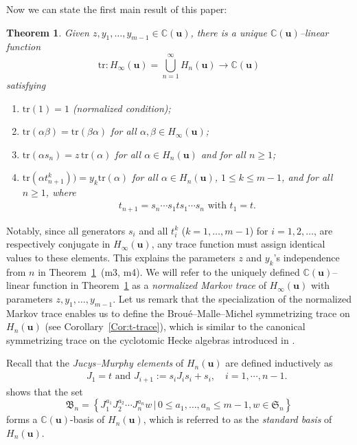 \documentclass[a4paper, oneside]{amsart}
\numberwithin{equation}{section}
\newtheorem{theorem}[equation]{Theorem}
\theoremstyle{definition}
\theoremstyle{remark}
\begin{document}
 Now we can state the first main result of this paper:
\begin{theorem}\label{Them:Markov}
  Given $z, y_1, \ldots, y_{m-1}\in \mathbb{C}(\boldsymbol{u})$, there is  a  unique $\mathbb{C}(\boldsymbol{u})$--linear function
   \begin{equation*}
     \mathrm{tr}: H_{\infty}(\boldsymbol{u})=\bigcup_{n=1}^{\infty}H_n(\boldsymbol{u})\rightarrow\mathbb{C}(\boldsymbol{u})
\end{equation*}
satisfying
\begin{enumerate}
\item[(m1)] $ \mathrm{tr}(1)=1$ (normalized condition);
\item[(m2)] $\mathrm{tr}(\alpha\beta)=\mathrm{tr}(\beta\alpha)$ for all $\alpha,\beta\in H_{\infty}(\boldsymbol{u})$;
\item[(m3)] $\mathrm{tr}(\alpha s_n)=z\,\mathrm{tr}(\alpha)$  for all $\alpha\in H_{n}(\boldsymbol{u})$ and for all $n\geq 1$;
\item[(m4)] $\mathrm{tr}(\alpha t_{n+1}^k))=y_{k}\mathrm{tr}(\alpha)$ for all $\alpha\in H_n(\boldsymbol{u})$,  $1\leq k\leq m-1$, and for all $n\geq 1$, where \begin{align*}t_{n+1}=s_{n}\cdots s_1ts_1\cdots s_{n} \text{ with }t_1=t.\end{align*}
\end{enumerate}
\end{theorem}
Notably, since all generators $s_i$ and all $t_i^k$ ($k=1, \ldots,m-1$) for $i=1,2,\ldots$, are respectively conjugate in $H_{\infty}(\boldsymbol{u})$, any trace function must assign identical values to these elements. This explains the parameters $z$ and $y_k$'s independence from $n$ in Theorem~\ref{Them:Markov}~(m3, m4). We will refer to the uniquely defined $\mathbb{C}(\boldsymbol{u})$--linear function in Theorem~\ref{Them:Markov} as a \emph{normalized Markov trace} of $H_{\infty}(\boldsymbol{u})$ with parameters $z, y_1, \ldots, y_{m-1}$. Let us remark that the specialization of the normalized Markov trace enables us to define the Brou\'{e}--Malle--Michel symmetrizing trace on $H_n(\boldsymbol{u})$ (see Corollary~\ref{Cor:t-trace}), which is similar to the canonical symmetrizing trace on the cyclotomic Hecke
algebras introduced in \cite[\S2B]{BM}.



Recall that the \emph{Jucys--Murphy elements} of $H_n(\boldsymbol{u})$ are defined inductively as
\begin{eqnarray}\label{Equ:JM-H}
 &&J_1=t\text{ and }J_{i+1}\!:=s_iJ_{i}s_i+s_i, \quad i=1, \cdots, n-1.
  \end{eqnarray}
\cite[Theorem~7.5.6]{K} shows that the set
\begin{equation}\label{Equ:Standard-basis}
 \mathfrak{B}_n=\left\{J_1^{a_1}J_2^{a_2}\cdots J_{n}^{a_{n}}w\,|\,0\leq a_1, \ldots, a_n\leq m-1, w\in \mathfrak{S}_n\right\}
\end{equation}
forms a $\mathbb{C}(\boldsymbol{u})$-basis of $H_n(\boldsymbol{u})$, which is referred to as the \emph{standard basis} of $H_n(\boldsymbol{u})$.
\end{document}
